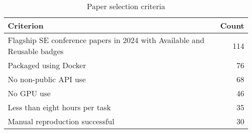 \begin{table}[t]
  \caption{Paper selection criteria}
  \label{t:paper_select}
  \centering
  \begin{tabular}{@{}l r@{}}
    \toprule
    Criterion & Count \\
    \midrule
    Flagship SE conference papers in 2024 with Available and Reusable badges & 114 \\
    Packaged using Docker & 76 \\
    No non-public API use & 68 \\
    No GPU use & 46 \\
    Less than eight hours per task & 35 \\
    Manual reproduction successful & 30 \\
    \bottomrule
  \end{tabular}
\end{table}


